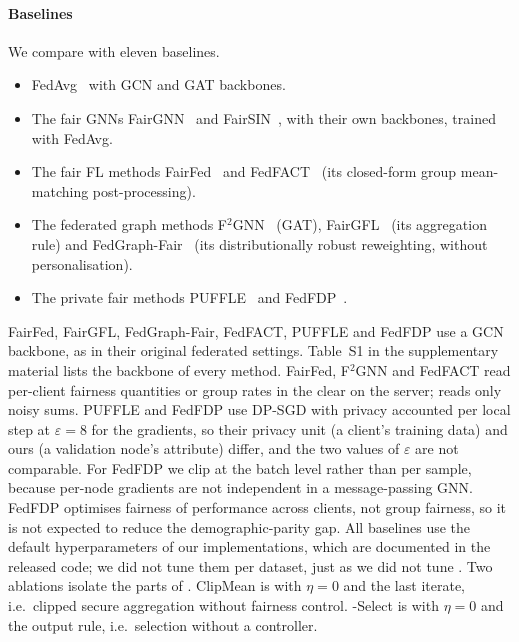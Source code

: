 \paragraph{Baselines}
We compare with eleven baselines.
\begin{itemize}
\item FedAvg~\citep{mcmahan2017communication} with GCN and GAT backbones.
\item The fair GNNs FairGNN~\citep{dai2021say} and FairSIN~\citep{yang2024fairsin}, with their own backbones, trained with FedAvg.
\item The fair FL methods FairFed~\citep{ezzeldin2023fairfed} and FedFACT~\citep{fedfact2025} (its closed-form group mean-matching post-processing).
\item The federated graph methods F$^2$GNN~\citep{f2gnn2023} (GAT), FairGFL~\citep{fairgfl2026} (its aggregation rule) and FedGraph-Fair~\citep{fedgraphfair2026} (its distributionally robust reweighting, without personalisation).
\item The private fair methods PUFFLE~\citep{corbucci2024puffle} and FedFDP~\citep{ling2024feddp}.
\end{itemize}
FairFed, FairGFL, FedGraph-Fair, FedFACT, PUFFLE and FedFDP use a GCN backbone, as in their original federated settings. Table~S1 in the supplementary material lists the backbone of every method. FairFed, F$^2$GNN and FedFACT read per-client fairness quantities or group rates in the clear on the server; \clamp{} reads only noisy sums. PUFFLE and FedFDP use DP-SGD with privacy accounted per local step at $\varepsilon=8$ for the gradients, so their privacy unit (a client's training data) and ours (a validation node's attribute) differ, and the two values of $\varepsilon$ are not comparable. For FedFDP we clip at the batch level rather than per sample, because per-node gradients are not independent in a message-passing GNN. FedFDP optimises fairness of performance across clients, not group fairness, so it is not expected to reduce the demographic-parity gap. All baselines use the default hyperparameters of our implementations, which are documented in the released code; we did not tune them per dataset, just as we did not tune \clamp{}. Two ablations isolate the parts of \clamp{}. ClipMean is \clamp{} with $\eta=0$ and the last iterate, i.e.\ clipped secure aggregation without fairness control. \clamp{}-Select is \clamp{} with $\eta=0$ and the output rule, i.e.\ selection without a controller.

